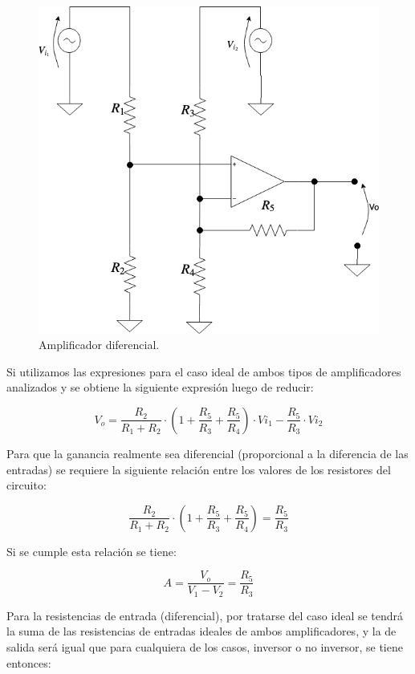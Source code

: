 \begin{figure}[H] %
\begin{center}
\includegraphics[width=0.5 \textwidth, angle=0]{./img/operacionales/OP_DIFF.png}
\caption{\label{fig:fig_operational_ideal_differential}\footnotesize{Amplificador diferencial.}}
\end{center}
\end{figure}

Si utilizamos las expresiones para el caso ideal de ambos tipos de amplificadores analizados y se obtiene la siguiente expresión luego de reducir:


\begin{equation}
V_{o} = \frac{ R_{2} }{ R_{1}  + R_{2}  } \cdot \left( 1 + \frac{R_{5}}{R_{3}} + \frac{R_{5}}{R_{4}}   \right)  \cdot V{i_{1}} - \frac{R_{5}}{R_{3}} \cdot V{i_{2}}
\end{equation}

Para que la ganancia realmente sea diferencial (proporcional a la diferencia de las entradas) se requiere la siguiente relación entre los valores de los resistores del circuito:


\begin{equation}
\frac{ R_{2} }{ R_{1}  + R_{2}  } \cdot \left( 1 + \frac{R_{5}}{R_{3}} + \frac{R_{5}}{R_{4}}   \right) = \frac{R_{5}}{R_{3}}
\end{equation}

Si se cumple esta relación se tiene:


\begin{equation}
\boxed{A = \frac{V_{o}}{V_{1} - V_{2}} = \frac{R_{5}}{R_{3}}}
\end{equation}

Para la resistencias de entrada (diferencial), por tratarse del caso ideal se tendrá la suma de las resistencias de entradas ideales de ambos amplificadores, y la de salida será igual que para cualquiera de los casos, inversor o no inversor, se tiene entonces:


